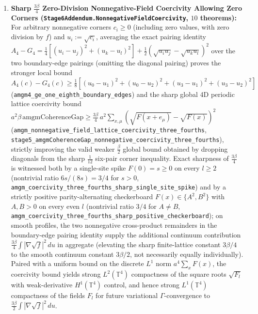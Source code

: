 \begin{enumerate}[leftmargin=2em]
\begin{equation}
  \left|Q_n(f) - \frac{3\beta}{8}\int_{[0,1]^4}\frac{|\nabla f(u)|^2}{f(u)}\,du\right| \le \frac{\beta\,(B_4/4 + C_2)}{n^2},
  \label{eq:monograph_stage6_torus_conv}
  \end{equation}
  where the continuum integral is nonnegative (strictly positive when $\beta > 0$ and $f$ is nonconstant), confirmed numerically at order $1.990123$ on a 4D all-6-plane profile ($n=8..32$) and $1.999907$ on a 1D cosine profile ($n=32..256$).
  \item \textbf{Sharp $\frac{3\beta}{4}$ Zero-Division Nonnegative-Field Coercivity Allowing Zero Corners (\texttt{Stage6Addendum.\allowbreak{}NonnegativeFieldCoercivity}, $10$ theorems):} For arbitrary nonnegative corners $c_i \ge 0$ (including zero values, with zero division by $f$) and $u_i := \sqrt{c_i}$, averaging the exact pairing identity $A_4 - G_4 = \frac{1}{4}[(u_i-u_j)^2 + (u_k-u_l)^2] + \frac{1}{2}(\sqrt{u_i u_j}-\sqrt{u_k u_l})^2$ over the two boundary-edge pairings (omitting the diagonal pairing) proves the stronger local bound $A_4(c) - G_4(c) \ge \frac{1}{8}[(u_0-u_1)^2+(u_0-u_2)^2+(u_3-u_1)^2+(u_3-u_2)^2]$ (\texttt{amgm4\_\allowbreak{}ge\_\allowbreak{}one\_\allowbreak{}eighth\_\allowbreak{}boundary\_\allowbreak{}edges}) and the sharp global 4D periodic lattice coercivity bound $a^2\beta\,\mathrm{amgmCoherenceGap} \ge \frac{3\beta}{4}\,a^2\sum_{x,\mu}(\sqrt{F(x+e_\mu)}-\sqrt{F(x)})^2$ (\texttt{amgm\_\allowbreak{}nonnegative\_\allowbreak{}field\_\allowbreak{}lattice\_\allowbreak{}coercivity\_\allowbreak{}three\_\allowbreak{}fourths}, \texttt{stage5\_\allowbreak{}amgmCoherenceGap\_\allowbreak{}nonnegative\_\allowbreak{}coercivity\_\allowbreak{}three\_\allowbreak{}fourths}), strictly improving the valid weaker $\frac{\beta}{2}$ global bound obtained by dropping diagonals from the sharp $\frac{1}{12}$ six-pair corner inequality. Exact sharpness of $\frac{3\beta}{4}$ is witnessed both by a single-site spike $F(0)=s \ge 0$ on every $l \ge 2$ (nontrivial ratio $6s/(8s) = 3/4$ for $s > 0$, \texttt{amgm\_\allowbreak{}coercivity\_\allowbreak{}three\_\allowbreak{}fourths\_\allowbreak{}sharp\_\allowbreak{}single\_\allowbreak{}site\_\allowbreak{}spike}) and by a strictly positive parity-alternating checkerboard $F(x)\in\{A^2, B^2\}$ with $A,B>0$ on every even $l$ (nontrivial ratio $3/4$ for $A \ne B$, \texttt{amgm\_\allowbreak{}coercivity\_\allowbreak{}three\_\allowbreak{}fourths\_\allowbreak{}sharp\_\allowbreak{}positive\_\allowbreak{}checkerboard}); on smooth profiles, the two nonnegative cross-product remainders in the boundary-edge pairing identity supply the additional continuum contribution $\frac{3\beta}{4}\int |\nabla\sqrt{f}|^2\,du$ in aggregate (elevating the sharp finite-lattice constant $3\beta/4$ to the smooth continuum constant $3\beta/2$, not necessarily equally individually). Paired with a uniform bound on the discrete $L^1$ norm $a^4\sum_x F(x)$, the coercivity bound yields strong $L^2(\mathbb{T}^4)$ compactness of the square roots $\sqrt{F_l}$ with weak-derivative $H^1(\mathbb{T}^4)$ control, and hence strong $L^1(\mathbb{T}^4)$ compactness of the fields $F_l$ for future variational $\Gamma$-convergence to $\frac{3\beta}{2}\int |\nabla\sqrt{f}|^2\,du$.

\end{enumerate}
